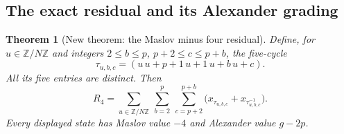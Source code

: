 \documentclass[11pt,oneside]{report}
\newtheorem{theorem}{Theorem}[section]
\theoremstyle{definition}
\numberwithin{equation}{section}
\begin{document}
\subsection{The exact residual and its Alexander grading}

\begin{theorem}[New theorem: the Maslov minus four residual]
\label{J21:thm:m4-exact}
Define, for $u\in\mathbb Z/N\mathbb Z$ and integers
$2\leq b\leq p$, $p+2\leq c\leq p+b$, the five-cycle
\[
             \tau_{u,b,c}=(u\,u+p+1\,u+1\,u+b\,u+c).
\]
All its five entries are distinct. Then
\[
 R_4=\sum_{u\in\mathbb Z/N\mathbb Z}
          \ \sum_{b=2}^{p}\ \sum_{c=p+2}^{p+b}
                   \bigl(x_{\tau_{u,b,c}}
                         +x_{\tau_{u,b,c}^{-1}}\bigr).
 \tag{M4B.3}
\]
Every displayed state has Maslov value $-4$ and Alexander value $g-2p$.
\end{theorem}
\end{document}
